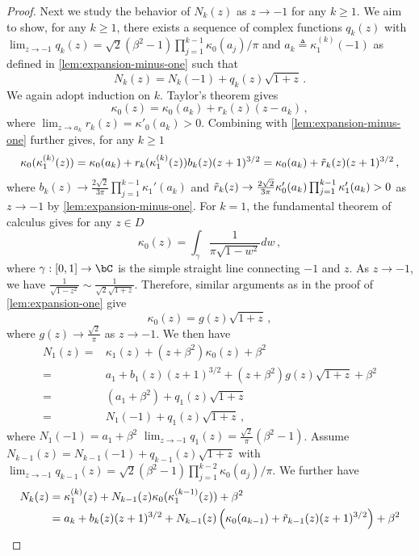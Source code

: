 \documentclass[11pt]{article}
\newcommand{\g}{\kappa_1}
\begin{document}
\begin{proof}
Next we study the behavior of $N_k(z)$ as $z\to -1$ for any $k\geq 1$. We aim to show, for any $k\geq 1$, there exists a sequence of complex functions $q_k(z)$ with $\lim_{z\to -1}q_k(z)=\sqrt{2}(\beta^2-1)\prod_{j=1}^{k-1}\kappa_0(a_j)/\pi$ and $a_k \triangleq \g^{(k)}(-1)$ as defined in \cref{lem:expansion-minus-one} such that 
\begin{equation}\label{eq:Kk-around-1}
    N_k(z) = N_k(-1) + q_k(z)\sqrt{1+z}\,.
\end{equation}
We again adopt induction on $k$. Taylor's theorem gives
\[
\kappa_0(z) = \kappa_0(a_k) + r_k(z)(z- a_k)
\,,
\]
where $\lim_{z\to a_k} r_k(z)= \kappa'_0(a_k)>0$. Combining with \cref{lem:expansion-minus-one} further gives, for any $k\geq 1$
\[
\kappa_0(\g^{(k)}(z)) = \kappa_0(a_k) + r_k(\g^{(k)}(z))b_k(z)(z+1)^{3/2}
= \kappa_0(a_k) + \Tilde{r}_k(z)(z+1)^{3/2}
\,,
\]
where $b_k(z)\to \frac{2\sqrt{2}}{3\pi} \prod_{j=1}^{k-1}\g'(a_k)$ and $\Tilde{r}_k(z)\to \frac{2\sqrt{2}}{3\pi} \kappa'_0(a_k)  \prod_{j=1}^{k-1}\g'(a_k) > 0 $ as $z\to -1$ by \cref{lem:expansion-minus-one}. For $k=1$, the fundamental theorem of calculus gives for any $z\in D$ \begin{equation*}
    \kappa_0(z) = \int_{\gamma} \frac{1}{\pi  \sqrt{1-w^2}} dw\,,
\end{equation*}
where $\gamma:[0,1]\to\bC$ is the simple straight line connecting $-1$ and $z$. As $z\to -1$, we have $\frac{1}{\sqrt{1-z^2}}\sim \frac{1}{\sqrt{2}\sqrt{1+z}}$. Therefore, similar arguments as in the proof of \cref{lem:expansion-one} give
\[
\kappa_0(z) =  g(z)\sqrt{1+z}\,,
\]
where $g(z)\to \frac{\sqrt{2}}{\pi}$ as $z\to -1$. We then have
 \begin{align*}
    N_1(z) ={}& \g(z) + (z+\beta^2)\kappa_0(z) + \beta^2\\
    ={}& a_1 + b_1(z)(z+1)^{3/2} + (z+\beta^2)g(z)\sqrt{1+z} + \beta^2\\
    ={}& (a_1+\beta^2) + q_1(z)\sqrt{1+z}\\
    ={}& N_1(-1) + q_1(z)\sqrt{1+z}\,,
\end{align*}
where $N_1(-1)=a_1+\beta^2$ $\lim_{z\to -1} q_1(z)= \frac{\sqrt{2}}{\pi}(\beta^2-1)$. Assume $N_{k-1}(z)=N_{k-1}(-1)+q_{k-1}(z)\sqrt{1+z}$ with $\lim_{z\to -1}q_{k-1}(z)=\sqrt{2}(\beta^2-1)\prod_{j=1}^{k-2}\kappa_0(a_j)/\pi$. We further have 
\begin{align*}
     N_k(z)
    ={}& \g^{(k)}(z) + N_{k-1}(z)\kappa_0(\g^{(k-1)}(z)) + \beta^2\\
    ={}& a_k + b_k(z)(z+1)^{3/2} + N_{k-1}(z)\left( \kappa_0(a_{k-1}) + \Tilde{r}_{k-1}(z)(z+1)^{3/2} \right) + \beta^2\\

\end{align*}
\end{proof}
\end{document}
